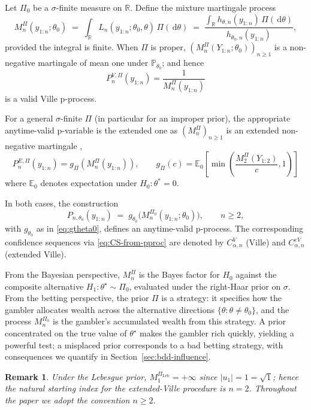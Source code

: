 \documentclass{article}%
\newtheorem{remark}[theorem]{Remark}
\newcommand{\E}{\mathbb{E}}
\newcommand{\Prob}{\mathbb{P}}
\newcommand{\dd}{\,\mathrm{d}}
\newcommand{\Leb}{\mathrm{Leb}}
\newcommand{\1}{\mathbf{1}}
\begin{document}
Let \(\Pi_0\) be a \(\sigma\)-finite measure on \(\mathbb{R}\). Define the
mixture martingale process
\begin{equation}\label{eq:Mn-def}
  M_n^{\Pi}(y_{1:n};\theta_0)
  \;=\;\int_\mathbb{R} L_n(y_{1:n};\theta_0,\theta)\,\Pi(\dd\theta)
  \;=\;\frac{\int_\mathbb{R} h_{\theta,n}(y_{1:n})\,\Pi(\dd\theta)}
            {h_{\theta_0,n}(y_{1:n})},
\end{equation}
provided the integral is finite. When \(\Pi\) is proper,
\((M_n^{\Pi}(Y_{1:n};\theta_0))_{n\geq 1}\) is a non-negative
martingale of mean one under \(\Prob_{\theta_0}\); and hence
\[
P_n^{V,\Pi}(y_{1:n})=\frac{1}{M_n^\Pi(y_{1:n})}
\]
is a valid Ville p-process.

For a general $\sigma$-finite $\Pi$ (in particular for an improper prior), the appropriate anytime-valid p-variable is the extended one as $(M_n^\Pi)_{n\geq 1}$ is an extended non-negative martingale \citep{wang2025extended},
\[
P_n^{E,\Pi}(y_{1:n})=g_\Pi(M_n^\Pi(y_{1:n})),
\qquad
g_\Pi(c)=\E_{0}\!\left[\min\!\left(\frac{M_2^\Pi(Y_{1:2})}{c},1\right)\right]
\]
where $\E_0$ denotes expectation under $H_0:\theta^*=0$.

In both
cases, the construction
\begin{equation}\label{eq:p-from-M}
  P_{n,\theta_0}(y_{1:n})
  \;=\;
  g_{\theta_0}\!\bigl(M_n^{\Pi_0}(y_{1:n};\theta_0)\bigr),
  \qquad n\geq 2,
\end{equation}
with \(g_{\theta_0}\) as in \eqref{eq:gtheta0}, defines an anytime-valid
p-process. The corresponding confidence sequences via
\eqref{eq:CS-from-pproc} are denoted by \(C^V_{\alpha,n}\) (Ville) and
\(C^{eV}_{\alpha,n}\) (extended Ville).

From the Bayesian perspective, \(M_n^{\Pi}\) is
the Bayes factor for \(H_0\) against the composite alternative
\(H_1:\theta^\star\sim\Pi_0\), evaluated under the right-Haar prior on
\(\sigma\). From the betting perspective, the prior \(\Pi\) is a strategy: it specifies how the gambler allocates wealth across the alternative directions \(\{\theta:\theta\neq\theta_0\}\), and the
process \(M_n^{\Pi_0}\) is the gambler's accumulated wealth from this
strategy. A prior concentrated on the true value of \(\theta^\star\)
makes the gambler rich quickly, yielding a powerful test; a misplaced
prior corresponds to a bad betting strategy, with consequences we
quantify in Section~\ref{sec:bdd-influence}.

\begin{remark}\label{rem:start-n2}
Under the Lebesgue prior, \(M_1^{\Pi_{\Leb}}=+\infty\) since
\(|u_1|=1=\sqrt 1\); hence the natural starting index for the
extended-Ville procedure is \(n=2\). Throughout the paper we adopt
the convention \(n\geq 2\).
\end{remark}
\end{document}
